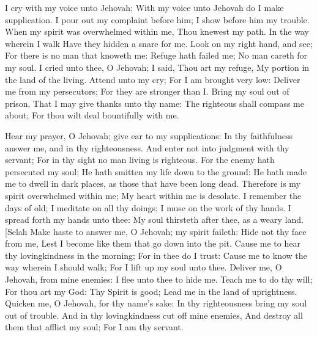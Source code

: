 I cry with my voice unto Jehovah; With my voice unto Jehovah do I make supplication.  I pour out my complaint before him; I show before him my trouble.  When my spirit was overwhelmed within me, Thou knewest my path. In the way wherein I walk Have they hidden a snare for me.  Look on my right hand, and see; For there is no man that knoweth me: Refuge hath failed me; No man careth for my soul.  I cried unto thee, O Jehovah; I said, Thou art my refuge, My portion in the land of the living.  Attend unto my cry; For I am brought very low: Deliver me from my persecutors; For they are stronger than I.  Bring my soul out of prison, That I may give thanks unto thy name: The righteous shall compass me about; For thou wilt deal bountifully with me. 

Hear my prayer, O Jehovah; give ear to my supplications: In thy faithfulness answer me, and in thy righteousness.  And enter not into judgment with thy servant; For in thy sight no man living is righteous.  For the enemy hath persecuted my soul; He hath smitten my life down to the ground: He hath made me to dwell in dark places, as those that have been long dead.  Therefore is my spirit overwhelmed within me; My heart within me is desolate.  I remember the days of old; I meditate on all thy doings; I muse on the work of thy hands.  I spread forth my hands unto thee: My soul thirsteth after thee, as a weary land. [Selah  Make haste to answer me, O Jehovah; my spirit faileth: Hide not thy face from me, Lest I become like them that go down into the pit.  Cause me to hear thy lovingkindness in the morning; For in thee do I trust: Cause me to know the way wherein I should walk; For I lift up my soul unto thee.  Deliver me, O Jehovah, from mine enemies: I flee unto thee to hide me.  Teach me to do thy will; For thou art my God: Thy Spirit is good; Lead me in the land of uprightness.  Quicken me, O Jehovah, for thy name’s sake: In thy righteousness bring my soul out of trouble.  And in thy lovingkindness cut off mine enemies, And destroy all them that afflict my soul; For I am thy servant. 

